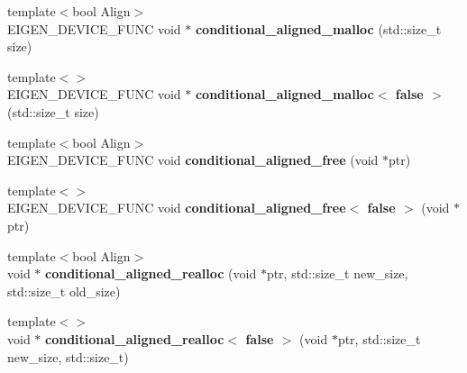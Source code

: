 \begin{DoxyCompactItemize}
\item 
\mbox{\label{namespace_eigen_1_1internal_a1a0570833e5374772ff9afd06537e1a8}} 
{\footnotesize template$<$bool Align$>$ }\\E\+I\+G\+E\+N\+\_\+\+D\+E\+V\+I\+C\+E\+\_\+\+F\+U\+NC void $\ast$ {\bfseries conditional\+\_\+aligned\+\_\+malloc} (std\+::size\+\_\+t size)
\item 
\mbox{\label{namespace_eigen_1_1internal_a27dc72b9a184a2a15c782f8c20e4b8a2}} 
{\footnotesize template$<$$>$ }\\E\+I\+G\+E\+N\+\_\+\+D\+E\+V\+I\+C\+E\+\_\+\+F\+U\+NC void $\ast$ {\bfseries conditional\+\_\+aligned\+\_\+malloc$<$ false $>$} (std\+::size\+\_\+t size)
\item 
\mbox{\label{namespace_eigen_1_1internal_a2a7fb46ed6502862862b417071e3d618}} 
{\footnotesize template$<$bool Align$>$ }\\E\+I\+G\+E\+N\+\_\+\+D\+E\+V\+I\+C\+E\+\_\+\+F\+U\+NC void {\bfseries conditional\+\_\+aligned\+\_\+free} (void $\ast$ptr)
\item 
\mbox{\label{namespace_eigen_1_1internal_a879b765262b6a5776aed464ae01e0520}} 
{\footnotesize template$<$$>$ }\\E\+I\+G\+E\+N\+\_\+\+D\+E\+V\+I\+C\+E\+\_\+\+F\+U\+NC void {\bfseries conditional\+\_\+aligned\+\_\+free$<$ false $>$} (void $\ast$ptr)
\item 
\mbox{\label{namespace_eigen_1_1internal_a0c633e0675f1eb9e93b1f4eac0b9f0de}} 
{\footnotesize template$<$bool Align$>$ }\\void $\ast$ {\bfseries conditional\+\_\+aligned\+\_\+realloc} (void $\ast$ptr, std\+::size\+\_\+t new\+\_\+size, std\+::size\+\_\+t old\+\_\+size)
\item 
\mbox{\label{namespace_eigen_1_1internal_aea41e5e1db6ad09e6179067833413451}} 
{\footnotesize template$<$$>$ }\\void $\ast$ {\bfseries conditional\+\_\+aligned\+\_\+realloc$<$ false $>$} (void $\ast$ptr, std\+::size\+\_\+t new\+\_\+size, std\+::size\+\_\+t)
\item 
\mbox{\label{namespace_eigen_1_1internal_a6f532d76e83ab848ef30d9540bc6c66c}} 

\end{DoxyCompactItemize}
